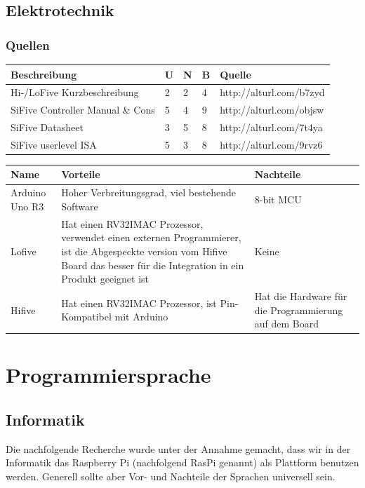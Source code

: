 \documentclass[a4paper]{report}
\begin{document}
\subsection{Elektrotechnik}
\label{app:ssec:ET}
\subsubsection{Quellen}
\begin{tabular}{|p{}|p{}|p{}|p{}|p{}|}
	\hline
	\textbf{Beschreibung} & \textbf{U} & \textbf{N} & \textbf{B} & \textbf{Quelle} \\
	\hline
	Hi-/LoFive Kurzbeschreibung & 2 & 2 & 4 & http://alturl.com/b7zyd \\
	\hline
	SiFive Controller Manual \& Cons & 5 & 4 & 9 & http://alturl.com/objsw \\
	\hline
	SiFive Datasheet & 3 & 5  & 8 & http://alturl.com/7t4ya \\
	\hline
	SiFive userlevel ISA & 5 & 3 & 8 & http://alturl.com/9rvz6 \\
	\hline
\end{tabular}

\vspace{1em}
\noindent
\begin{tabular}{|p{}|p{}|p{}|}
  \hline
  \textbf{Name} & \textbf{Vorteile} & \textbf{Nachteile} \\
  \hline
	Arduino Uno R3 & Hoher Verbreitungsgrad, viel bestehende Software & 8-bit MCU \\
	\hline
  Lofive & Hat einen RV32IMAC Prozessor, verwendet einen externen Programmierer, ist die Abgespeckte version vom Hifive Board das besser für die Integration in ein Produkt geeignet ist & Keine \\
  \hline
  Hifive & Hat einen RV32IMAC Prozessor, ist Pin-Kompatibel mit Arduino & Hat die Hardware für die Programmierung auf dem Board \\
  \hline
\end{tabular}
\section{Programmiersprache}
\label{app:sec:PrgSprachen}

\subsection{Informatik}
\label{app:ssec:PrgInf}
Die nachfolgende Recherche wurde unter der Annahme gemacht, dass wir in der Informatik das Raspberry Pi (nachfolgend RasPi genannt) als Plattform benutzen werden. Generell sollte aber Vor- und Nachteile der Sprachen universell sein.
\end{document}
